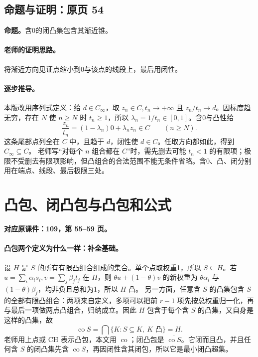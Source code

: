 \documentclass[11pt,a4paper]{article}
\DeclareMathOperator{\conv}{co}\DeclareMathOperator{\cl}{cl}
\theoremstyle{definition}\newtheorem{definition}{定义}\newtheorem{example}{例}
\begin{document}
\subsection{命题与证明：原页 54}

\textbf{命题。}含0的闭凸集包含其渐近锥。

\paragraph{老师的证明思路。}将渐近方向见证点缩小到0与该点的线段上，最后用闭性。

\paragraph{逐步推导。}
本版改用序列式定义：给 $d\in C_\infty$，取 $z_n\in C,t_n\to+\infty$ 且 $z_n/t_n\to d$。因标度趋无穷，存在 $N$ 使 $n\ge N$ 时 $t_n\ge1$，所以 $\lambda_n=1/t_n\in[0,1]$。含0与凸性给
\[\frac{z_n}{t_n}=(1-\lambda_n)0+\lambda_nz_n\in C\qquad(n\ge N).\]
这条尾部点列全在 $C$ 中，且趋于 $d$，闭性使 $d\in C$。任取方向都如此，得到 $C_\infty\subseteq C$。
老师写“对每个 $n$ 组合都在 $C$”时，需先删去可能 $t_n<1$ 的有限项；极限不受删去有限项影响，但凸组合的合法范围不能无条件省略。含0、凸、闭分别用在端点、线段、最后极限三处。


\clearpage\section{凸包、闭凸包与凸包和公式}\label{g:109:55}

\textbf{对应原课件：109，第 55--59 页。}


\paragraph{凸包两个定义为什么一样：补全基础。}
设 $H$ 是 $S$ 的所有有限凸组合组成的集合。单个点取权重1，所以 $S\subseteq H$。若 $u=\sum_i\alpha_i s_i,v=\sum_j\beta_j t_j$ 在 $H$，则 $\theta u+(1-\theta)v$ 的新权重为 $\theta\alpha_i$ 与 $(1-\theta)\beta_j$，均非负且总和为1，所以 $H$ 凸。
另一方面，任意含 $S$ 的凸集包含 $S$ 的全部有限凸组合：两项来自定义，多项可以把前 $r-1$ 项先按总权重归一化，再与最后一项做两点凸组合，归纳成立。因此 $H$ 包含于每个含 $S$ 的凸集，又自身是这样的凸集，故
\[\conv S=\bigcap\{K:S\subseteq K,\ K\text{ 凸}\}=H.
\]
老师用上点或 $\mathrm{CH}$ 表示凸包，本文用 $\conv$；闭凸包是 $\overline{\conv S}$。它闭而且凸，并且任何含 $S$ 的闭凸集先含 $\conv S$，再因闭性含其闭包，所以它是最小闭凸超集。
\end{document}
